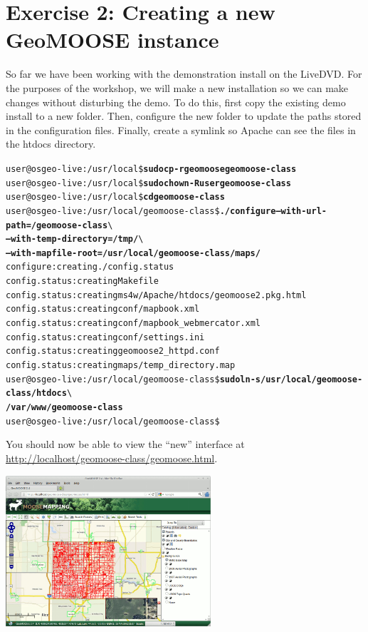 \documentclass[letterpaper]{article}
\begin{document}
\section*{Exercise 2: Creating a new GeoMOOSE instance}
So far we have been working with the demonstration install on the
LiveDVD.  For the purposes of the workshop, we will make a new
installation so we can make changes without disturbing the demo. To do
this, first copy the existing demo install to a new folder.  Then,
configure the new folder to update the paths stored in the
configuration files. Finally, create a symlink so Apache can see the
files in the htdocs directory.

\begin{alltt}
user@osgeo-live:/usr/local\$ \textbf{sudo cp -r geomoose geomoose-class}
user@osgeo-live:/usr/local\$ \textbf{sudo chown -R user geomoose-class}
user@osgeo-live:/usr/local\$ \textbf{cd geomoose-class}
user@osgeo-live:/usr/local/geomoose-class\$ \textbf{./configure --with-url-path=/geomoose-class} \verb'\'
\textbf{                                              --with-temp-directory=/tmp/} \verb'\'
\textbf{                                              --with-mapfile-root=/usr/local/geomoose-class/maps/}
configure: creating ./config.status
config.status: creating Makefile
config.status: creating ms4w/Apache/htdocs/geomoose2.pkg.html
config.status: creating conf/mapbook.xml
config.status: creating conf/mapbook_webmercator.xml
config.status: creating conf/settings.ini
config.status: creating geomoose2_httpd.conf
config.status: creating maps/temp_directory.map
user@osgeo-live:/usr/local/geomoose-class\$ \textbf{sudo ln -s /usr/local/geomoose-class/htdocs} \verb'\'
\textbf{                                                       /var/www/geomoose-class}
user@osgeo-live:/usr/local/geomoose-class\$ 
\end{alltt}

\noindent
You should now be able to view the ``new'' interface at \url{http://localhost/geomoose-class/geomoose.html}.
\begin{center}
  \includegraphics[width=3in]{images/02-results.png}
\end{center}
\end{document}
